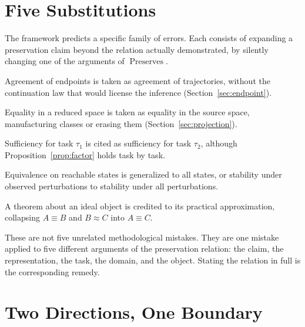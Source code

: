 \documentclass[11pt]{article}
\theoremstyle{remark}
\DeclareMathOperator{\Pres}{Preserves}
\begin{document}
\section{Five Substitutions}

The framework predicts a specific family of errors. Each consists of expanding a preservation claim beyond the relation actually demonstrated, by silently changing one of the arguments of $\Pres$.

\begin{description}[leftmargin=1.5em, style=nextline]
\item[Endpoint substitution.] Agreement of endpoints is taken as agreement of trajectories, without the continuation law that would license the inference (Section~\ref{sec:endpoint}).
\item[Projection substitution.] Equality in a reduced space is taken as equality in the source space, manufacturing classes or erasing them (Section~\ref{sec:projection}).
\item[Task substitution.] Sufficiency for task $\tau_1$ is cited as sufficiency for task $\tau_2$, although Proposition~\ref{prop:factor} holds task by task.
\item[Domain substitution.] Equivalence on reachable states is generalized to all states, or stability under observed perturbations to stability under all perturbations.
\item[Approximation substitution.] A theorem about an ideal object is credited to its practical approximation, collapsing $A\equiv B$ and $B\approx C$ into $A\equiv C$.
\end{description}

These are not five unrelated methodological mistakes. They are one mistake applied to five different arguments of the preservation relation: the claim, the representation, the task, the domain, and the object. Stating the relation in full is the corresponding remedy.

\section{Two Directions, One Boundary}
\end{document}
